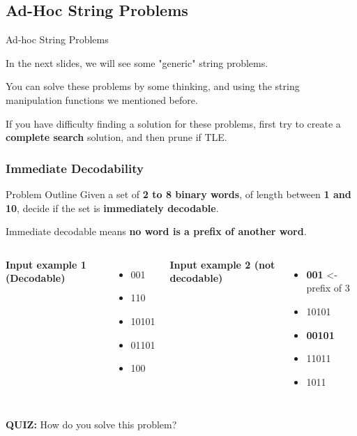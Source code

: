 \subsection{Ad-Hoc String Problems}

\begin{frame}{Ad-hoc String Problems}

  In the next slides, we will see some "generic" string problems.
  \bigskip

  You can solve these problems by some thinking, and using the string
  manipulation functions we mentioned before.\bigskip

  If you have difficulty finding a solution for these problems,
  first try to create a {\bf complete search} solution, and then
  prune if TLE.
\end{frame}

\begin{frame}
  \frametitle{Immediate Decodability}
    \begin{exampleblock}{Problem Outline}
      Given a set of {\bf 2 to 8 binary words}, of length
      between {\bf 1 and 10}, decide if the set is {\bf immediately
      decodable}. \bigskip

      Immediate decodable means {\bf no word is a prefix of
      another word}.
    \end{exampleblock}

    \begin{columns}
      {\bf Input example 1 (Decodable)}
      \begin{itemize}
        \item 001
        \item 110
        \item 10101
        \item 01101
        \item 100
      \end{itemize}
      {\bf Input example 2 (not decodable)}
      \begin{itemize}
        \item {\bf 001}   <- prefix of 3
        \item 10101
        \item {\bf 00101}
        \item 11011
        \item 1011
      \end{itemize}
    \end{columns}\medskip

    {\bf QUIZ:} How do you solve this problem?
\end{frame}



